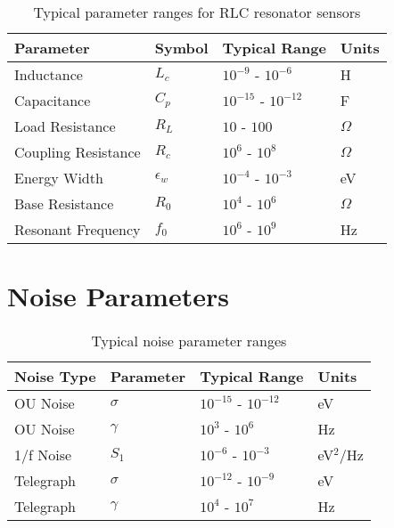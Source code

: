\documentclass[11pt,a4paper]{article}
\begin{document}
\begin{table}[H]
\centering
\begin{tabular}{llll}
\toprule
Parameter & Symbol & Typical Range & Units \\
\midrule
Inductance & $L_c$ & $10^{-9}$ - $10^{-6}$ & H \\
Capacitance & $C_p$ & $10^{-15}$ - $10^{-12}$ & F \\
Load Resistance & $R_L$ & $10$ - $100$ & $\Omega$ \\
Coupling Resistance & $R_c$ & $10^6$ - $10^8$ & $\Omega$ \\
Energy Width & $\epsilon_w$ & $10^{-4}$ - $10^{-3}$ & eV \\
Base Resistance & $R_0$ & $10^4$ - $10^6$ & $\Omega$ \\
Resonant Frequency & $f_0$ & $10^6$ - $10^9$ & Hz \\
\bottomrule
\end{tabular}
\caption{Typical parameter ranges for RLC resonator sensors}
\end{table}

\section{Noise Parameters}

\begin{table}[H]
\centering
\begin{tabular}{llll}
\toprule
Noise Type & Parameter & Typical Range & Units \\
\midrule
OU Noise & $\sigma$ & $10^{-15}$ - $10^{-12}$ & eV \\
OU Noise & $\gamma$ & $10^3$ - $10^6$ & Hz \\
1/f Noise & $S_1$ & $10^{-6}$ - $10^{-3}$ & eV$^2$/Hz \\
Telegraph & $\sigma$ & $10^{-12}$ - $10^{-9}$ & eV \\
Telegraph & $\gamma$ & $10^4$ - $10^7$ & Hz \\
\bottomrule
\end{tabular}
\caption{Typical noise parameter ranges}
\end{table}
\end{document}
